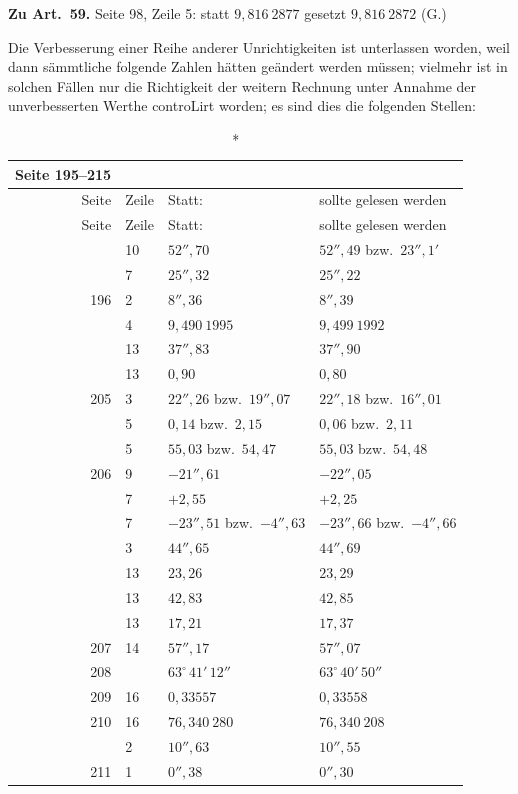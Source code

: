 \documentclass[11pt,a4paper]{article}
\begin{document}
\vspace{0.3em}
\noindent\textbf{Zu Art.~59.} Seite 98, Zeile 5: statt $9{,}816\ 2877$ gesetzt $9{,}816\ 2872$ (G.)

\newpage
\setcounter{page}{263}

Die Verbesserung einer Reihe anderer Unrichtigkeiten ist unterlassen worden, weil dann sämmtliche folgende Zahlen hätten geändert werden müssen; vielmehr ist in solchen Fällen nur die Richtigkeit der weitern Rechnung unter Annahme der unverbesserten Werthe controLirt worden; es sind dies die folgenden Stellen:

\begin{longtable}{rp{3cm}ll}
\caption*{Seite 195--215} \\
\toprule
Seite & Zeile & Statt: & sollte gelesen werden \\
\midrule
\endfirsthead
\toprule
Seite & Zeile & Statt: & sollte gelesen werden \\
\midrule
\endhead
\bottomrule
\endfoot
195 & 10 & $52''{,}70$ & $52''{,}49$ bzw.\ $23''{,}1'$ \\
 & 7 & $25''{,}32$ & $25''{,}22$ \\
196 & 2 & $8''{,}36$ & $8''{,}39$ \\
 & 4 & $9{,}490\ 1995$ & $9{,}499\ 1992$ \\
 & 13 & $37''{,}83$ & $37''{,}90$ \\
 & 13 & $0{,}90$ & $0{,}80$ \\
205 & 3 & $22''{,}26$ bzw.\ $19''{,}07$ & $22''{,}18$ bzw.\ $16''{,}01$ \\
 & 5 & $0{,}14$ bzw.\ $2{,}15$ & $0{,}06$ bzw.\ $2{,}11$ \\
 & 5 & $55{,}03$ bzw.\ $54{,}47$ & $55{,}03$ bzw.\ $54{,}48$ \\
206 & 9 & $-21''{,}61$ & $-22''{,}05$ \\
 & 7 & $+2{,}55$ & $+2{,}25$ \\
 & 7 & $-23''{,}51$ bzw.\ $-4''{,}63$ & $-23''{,}66$ bzw.\ $-4''{,}66$ \\
 & 3 & $44''{,}65$ & $44''{,}69$ \\
 & 13 & $23{,}26$ & $23{,}29$ \\
 & 13 & $42{,}83$ & $42{,}85$ \\
 & 13 & $17{,}21$ & $17{,}37$ \\
207 & 14 & $57''{,}17$ & $57''{,}07$ \\
208 & & $63^\circ\,41'\,12''$ & $63^\circ\,40'\,50''$ \\
209 & 16 & $0{,}33557$ & $0{,}33558$ \\
210 & 16 & $76{,}340\ 280$ & $76{,}340\ 208$ \\
 & 2 & $10''{,}63$ & $10''{,}55$ \\
211 & 1 & $0''{,}38$ & $0''{,}30$ \\
\bottomrule
\end{longtable}
\end{document}
